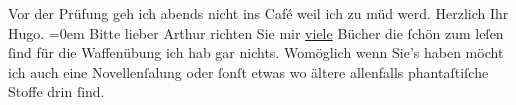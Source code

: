 \begin{ledgroupsized}[t]{13cm}
           \pstart
           Vor der Prüfung geh ich abends nicht ins Café weil ich zu müd werd.\pend
           \pstart
           Herzlich Ihr{\\[\baselineskip]}\spacefill\mbox{Hugo.}\pend
           \leftskip=0em{}\pstart
           \noindent{}Bitte lieber Arthur richten Sie {\pb}mir \uline{viele} Bücher die ſchön zum leſen ſind für
                  die Waffenübung ich hab gar nichts. Womöglich wenn Sie’s haben möcht ich auch eine
                     Novellenſa{\geminationm}lung oder ſonſt etwas wo ältere
                  allenfalls phantaſtiſche Stoffe drin ſind.\pend
           
         
         \endnumbering{}\end{ledgroupsized}  \newcommand{\dateiname}{L00808}\newcommand{\titel}{Hugo von Hofmannsthal an Arthur Schnitzler, [21. 6. 1898]}\newcommand{\editorInnen}{Martin Anton Müller und Gerd-Hermann Susen}
      